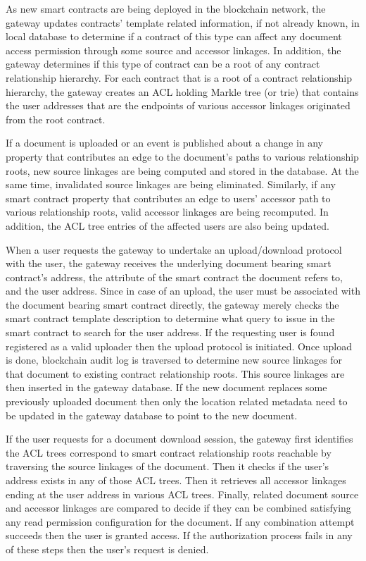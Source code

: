 \documentclass[conference]{IEEEtran}
\begin{document}
As new smart contracts are being deployed in the blockchain network, the gateway updates contracts' template related information, if not already known, in local database to determine if a contract of this type can affect any document access permission through some source and accessor linkages. In addition, the gateway determines if this type of contract can be a root of any contract relationship hierarchy. For each contract that is a root of a contract relationship hierarchy, the gateway creates an ACL holding Markle tree (or trie) \cite{6233691} that contains the user addresses that are the endpoints of various accessor linkages originated from the root contract.

If a document is uploaded or an event is published about a change in any property that contributes an edge to the document's paths to various relationship roots, new source linkages are being computed and stored in the database. At the same time, invalidated source linkages are being eliminated. Similarly, if any smart contract property that contributes an edge to users' accessor path to various relationship roots, valid accessor linkages are being recomputed. In addition, the ACL tree entries of the affected users are also being updated.

When a user requests the gateway to undertake an upload/download protocol with the user, the gateway receives the underlying document bearing smart contract's address, the attribute of the smart contract the document refers to, and the user address. Since in case of an upload, the user must be associated with the document bearing smart contract directly, the gateway merely checks the smart contract template description to determine what query to issue in the smart contract to search for the user address. If the requesting user is found registered as a valid uploader then the upload protocol is initiated. Once upload is done, blockchain audit log is traversed to determine new source linkages for that document to existing contract relationship roots. This source linkages are then inserted in the gateway database. If the new document replaces some previously uploaded document then only the location related metadata need to be updated in the gateway database to point to the new document.       

If the user requests for a document download session, the gateway first identifies the ACL trees correspond to smart contract relationship roots reachable by traversing the source linkages of the document. Then it checks if the user's address exists in any of those ACL trees. Then it retrieves all accessor linkages ending at the user address in various ACL trees. Finally, related document source and accessor linkages are compared to decide if they can be combined satisfying any read permission configuration for the document. If any combination attempt succeeds then the user is granted access. If the authorization process fails in any of these steps then the user's request is denied.          
        
\end{document}
